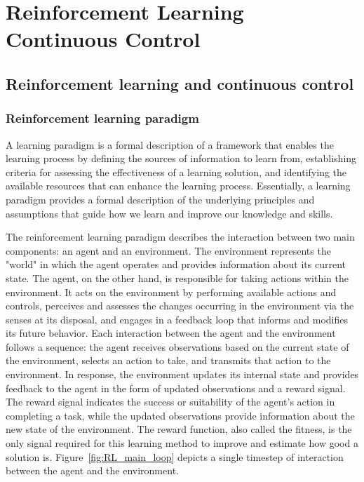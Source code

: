 
\chapter{Reinforcement Learning Continuous Control}
\label{ch:reinforcement_learning}

\section{Reinforcement learning and continuous control}

\subsection{Reinforcement learning paradigm}
A learning paradigm is a formal description of a framework that enables the learning process by defining the sources of information to learn from, establishing criteria for assessing the effectiveness of a learning solution, and identifying the available resources that can enhance the learning process. Essentially, a learning paradigm provides a formal description of the underlying principles and assumptions that guide how we learn and improve our knowledge and skills.

The reinforcement learning paradigm describes the interaction between two main components: an agent and an environment. The environment represents the "world" in which the agent operates and provides information about its current state. The agent, on the other hand, is responsible for taking actions within the environment. It acts on the environment by performing available actions and controls, perceives and assesses the changes occurring in the environment via the senses at its disposal, and engages in a feedback loop that informs and modifies its future behavior. Each interaction between the agent and the environment follows a sequence: the agent receives observations based on the current state of the environment, selects an action to take, and transmits that action to the environment. In response, the environment updates its internal state and provides feedback to the agent in the form of updated observations and a reward signal. The reward signal indicates the success or suitability of the agent's action in completing a task, while the updated observations provide information about the new state of the environment. The reward function, also called the fitness, is the only signal required for this learning method to improve and estimate how good a solution is. Figure~\ref{fig:RL_main_loop} depicts a single timestep of interaction between the agent and the environment.

